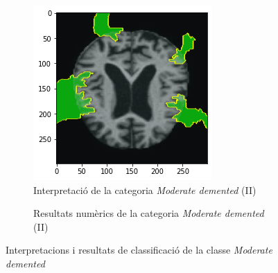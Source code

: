 \documentclass[a4paper,12pt]{report}
\begin{document}
\begin{figure}[h!]
\begin{subfigure}[b]{0.40\linewidth}
        \label{fig:ClassificacioModD1}
    \end{subfigure}
    \begin{subfigure}[b]{0.40\linewidth}
        \includegraphics[width=\linewidth]{images/Moderate 2.png}
        \caption{Interpretació de la categoria \textit{Moderate demented} (II)}
        \label{fig:ModD2}
    \end{subfigure}
    \begin{subfigure}[b]{0.40\linewidth}
        \caption{Resultats numèrics de la categoria \textit{Moderate demented} (II)}
        \label{fig:ClassificacioModD1}
    \end{subfigure}
    \caption{Interpretacions i resultats de classificació de la classe \textit{Moderate demented}}
    \label{fig:ModDInterpretacions}
\end{figure}
\end{document}
